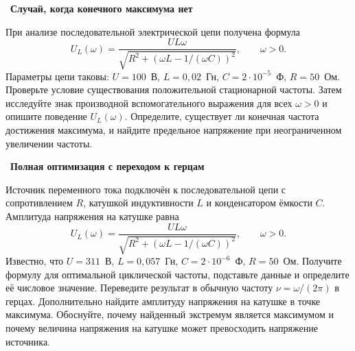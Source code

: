 \documentclass[a4paper,12pt]{article}
\newcommand{\task}[2]{\Needspace{12\baselineskip}\par\medskip\noindent{\color{darkaccent}\bfseries Задача~#1.}~\textbf{#2}\par\smallskip}
\begin{document}
\task{9}{Случай, когда конечного максимума нет}
При анализе последовательной электрической цепи получена формула
\[
U_L(\omega)=\frac{UL\omega}{\sqrt{R^2+(\omega L-1/(\omega C))^2}},\qquad \omega>0.
\]
Параметры цепи таковы: $U=100$~В, $L=0{,}02$~Гн, $C=2\cdot10^{-5}$~Ф, $R=50$~Ом. Проверьте условие существования положительной стационарной частоты. Затем исследуйте знак производной вспомогательного выражения для всех $\omega>0$ и опишите поведение $U_L(\omega)$. Определите, существует ли конечная частота достижения максимума, и найдите предельное напряжение при неограниченном увеличении частоты.

\task{10}{Полная оптимизация с переходом к герцам}
Источник переменного тока подключён к последовательной цепи с сопротивлением $R$, катушкой индуктивности $L$ и конденсатором ёмкости $C$. Амплитуда напряжения на катушке равна
\[
U_L(\omega)=\frac{UL\omega}{\sqrt{R^2+(\omega L-1/(\omega C))^2}},\qquad \omega>0.
\]
Известно, что $U=311$~В, $L=0{,}057$~Гн, $C=2\cdot10^{-6}$~Ф, $R=50$~Ом. Получите формулу для оптимальной циклической частоты, подставьте данные и определите её числовое значение. Переведите результат в обычную частоту $\nu=\omega/(2\pi)$ в герцах. Дополнительно найдите амплитуду напряжения на катушке в точке максимума. Обоснуйте, почему найденный экстремум является максимумом и почему величина напряжения на катушке может превосходить напряжение источника.

\clearpage
\end{document}
